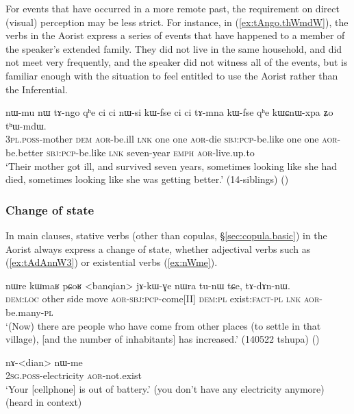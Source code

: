 For events that have occurred in a more remote past, the requirement on direct (visual) perception may be less strict. For instance, in (\ref{ex:tAngo.thWmdW}), the verbs in the Aorist express a series of events that have happened to a member of the speaker's extended family. They did not live in the same household, and did not meet very frequently, and the speaker did not witness all of the events, but is familiar enough with the situation to feel entitled to use the Aorist rather than the Inferential.

\begin{exe}
\ex \label{ex:tAngo.thWmdW}
 \gll nɯ-mu nɯ tɤ-ngo qʰe ci ci nɯ-si kɯ-fse ci ci tɤ-mna kɯ-fse qʰe kɯɕnɯ-xpa ʑo tʰɯ-mdɯ. \\
 \textsc{3pl}.\textsc{poss}-mother \textsc{dem} \textsc{aor}-be.ill \textsc{lnk} one one \textsc{aor}-die \textsc{sbj}:\textsc{pcp}-be.like  one one \textsc{aor}-be.better  \textsc{sbj}:\textsc{pcp}-be.like \textsc{lnk} seven-year \textsc{emph} \textsc{aor}-live.up.to \\
\glt `Their mother got ill, and survived seven years, sometimes looking like she had died, sometimes looking like she was getting better.' (14-siblings)
()
\end{exe}

\subsubsection{Change of state}   \label{sec:aor.inchoative}
In main clauses, stative verbs (other than copulas, §\ref{sec:copula.basic}) in the Aorist always express a change of state, whether adjectival verbs such as  (\ref{ex:tAdAnnW3}) or existential verbs (\ref{ex:nWme}).

\begin{exe}
\ex \label{ex:tAdAnnW3}
 \gll nɯre kɯmaʁ pɕoʁ <banqian> jɤ-kɯ-ɣe nɯra tu-nɯ tɕe, tɤ-dɤn-nɯ. \\
 \textsc{dem}:\textsc{loc} other side move \textsc{aor}-\textsc{sbj}:\textsc{pcp}-come[II] \textsc{dem}:\textsc{pl} exist:\textsc{fact}-\textsc{pl} \textsc{lnk} \textsc{aor}-be.many-\textsc{pl} \\
 \glt `(Now) there are people who have come from other places (to settle in that village), [and the number of inhabitants] has increased.' (140522 tshupa)
()
\end{exe}


\begin{exe}
\ex \label{ex:nWme}
 \gll nɤ-<dian> nɯ-me \\
 \textsc{2sg}.\textsc{poss}-electricity \textsc{aor}-not.exist \\
 \glt `Your [cellphone] is out of battery.' (you don't have any electricity anymore) (heard in context)
\end{exe}

